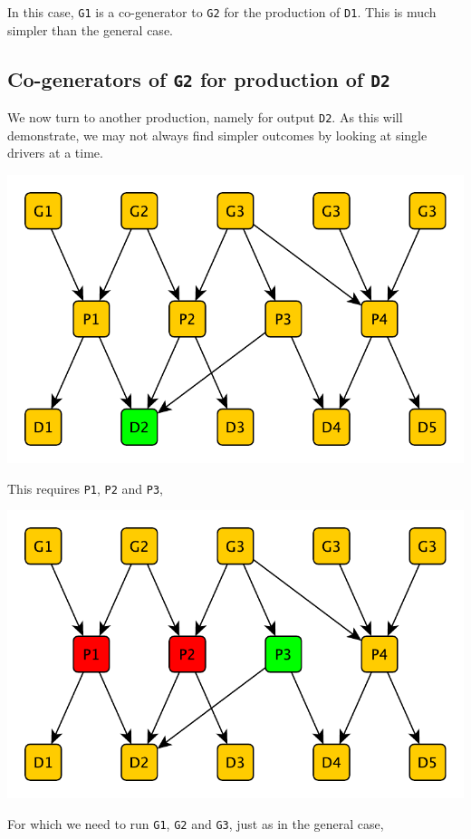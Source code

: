 \documentclass[a4paper]{article}
\def\G#1{\texttt{G#1}\xspace}
\def\P#1{\texttt{P#1}\xspace}
\def\D#1{\texttt{D#1}\xspace}
\begin{document}
In this case, \G1 is a co-generator to \G2 for the production of \D1.  This is much simpler than the general case.

\subsection{Co-generators of \G2 for production of \D2}

We now turn to another production, namely for output \D2.  As this will demonstrate, we may not always find simpler outcomes by looking at single drivers at a time.

\centerline{\includegraphics[scale=0.5]{img/network3-drivers-w2.pdf}}

This requires \P1, \P2 and \P3,

\centerline{\includegraphics[scale=0.5]{img/network4-varsneeded-w2.pdf}}

For which we need to run \G1, \G2 and \G3, just as in the general case,
\end{document}
